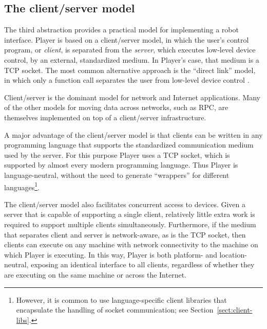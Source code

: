 \documentclass[letterpaper, 10 pt, conference]{iros03}
\begin{document}
\subsection{The client/server model}
The third abstraction provides a practical model for implementing a
robot interface.  Player is based on a client/server model, in which
the user's control program, or {\em client}, is separated from the
{\em server}, which executes low-level device control, by an external,
standardized medium.  In Player's case, that medium is a TCP socket.
The most common alternative approach is the ``direct link'' model, in
which only a function call separates the user from low-level device
control \cite{Jennings98}.

Client/server is the dominant model for network and Internet
applications. Many of the other models for moving data across
networks, such as RPC, are themselves implemented on top of a
client/server infrastructure.

A major advantage of the client/server model is that clients can be
written in any programming language that supports the standardized
communication medium used by the server.  For this purpose Player uses
a TCP socket, which is supported by almost every modern programming
language.  Thus Player is language-neutral, without the need to generate
``wrappers'' for different languages\footnote{However, it is common to
use language-specific client libraries that encapsulate the handling of
socket communication; see Section~\ref{sect:client-libs}.}.

The client/server model also facilitates concurrent access to devices.
Given a server that is capable of supporting a single client,
relatively little extra work is required to support multiple clients
simultaneously.  Furthermore, if the medium that separates client and
server is network-aware, as is the TCP socket, then clients can execute
on any machine with network connectivity to the machine on which Player
is executing.  In this way, Player is both platform- and location-neutral,
exposing an identical interface to all clients, regardless of whether
they are executing on the same machine or across the Internet.
\end{document}

